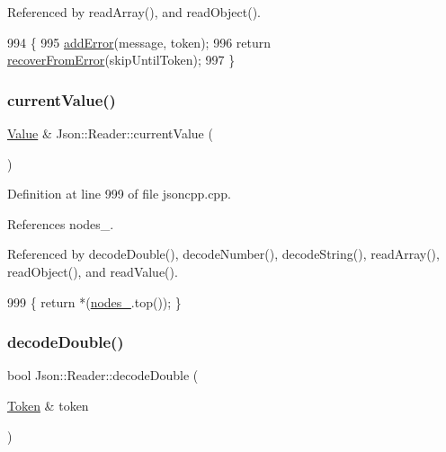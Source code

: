Referenced by read\+Array(), and read\+Object().


\begin{DoxyCode}
994                                                           \{
995   \hyperlink{class_json_1_1_reader_af02176a1d2786b4415bbb00a1b10bb6b}{addError}(message, token);
996   \textcolor{keywordflow}{return} \hyperlink{class_json_1_1_reader_a8d4ed03a43082c5ace81ba5b81425eaf}{recoverFromError}(skipUntilToken);
997 \}
\end{DoxyCode}
\mbox{\label{class_json_1_1_reader_a85597f763fb0148a17359b6dfc6f7326}} 
\subsubsection{\texorpdfstring{current\+Value()}{currentValue()}}
{\footnotesize\ttfamily \hyperlink{class_json_1_1_value}{Value} \& Json\+::\+Reader\+::current\+Value (\begin{DoxyParamCaption}{ }\end{DoxyParamCaption})\hspace{0.3cm}{\ttfamily [private]}}



Definition at line 999 of file jsoncpp.\+cpp.



References nodes\+\_\+.



Referenced by decode\+Double(), decode\+Number(), decode\+String(), read\+Array(), read\+Object(), and read\+Value().


\begin{DoxyCode}
999 \{ \textcolor{keywordflow}{return} *(\hyperlink{class_json_1_1_reader_ada3d2c47699dad662e6d156c8c78a6ac}{nodes\_}.top()); \}
\end{DoxyCode}
\mbox{\label{class_json_1_1_reader_a2420bbb7fd6d5d3e7e2fea894dd8f70f}} 
\subsubsection{\texorpdfstring{decode\+Double()}{decodeDouble()}\hspace{0.1cm}{\footnotesize\ttfamily [1/2]}}
{\footnotesize\ttfamily bool Json\+::\+Reader\+::decode\+Double (\begin{DoxyParamCaption}\item[{\hyperlink{class_json_1_1_reader_1_1_token}{Token} \&}]{token }\end{DoxyParamCaption})\hspace{0.3cm}{\ttfamily [private]}}



